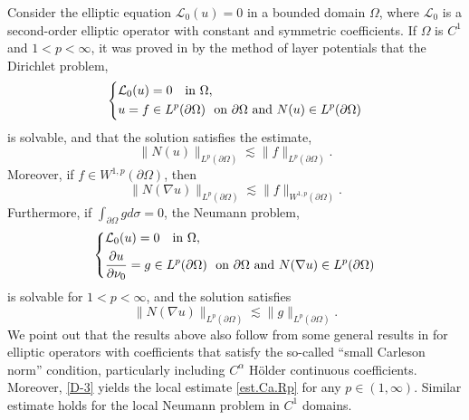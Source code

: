 \documentclass[reqno,12pt]{amsart} %
\theoremstyle{definition}
\theoremstyle{remark}
\numberwithin{equation}{section}
\begin{document}
Consider the elliptic equation 
$\mathcal{L}_0(u)=0$ in a bounded domain $\Omega$, where $\mathcal{L}_0$ is a second-order elliptic operator with constant and symmetric  coefficients.
If $\Omega$ is $C^1$ and $1<p< \infty$, it was proved  in \cite{Fabes1978} by the method of layer potentials that the Dirichlet problem,
\begin{equation}\label{D-1}
\left\{
\aligned 
& \mathcal{L}_0 (u) =0 \ \ \text{ in } \Omega,\\
& u=f \in L^p(\partial\Omega) \   \text{ on } \partial\Omega \text{ and } N(u) \in L^p(\partial\Omega)
\endaligned
\right.
\end{equation}
is solvable, and that  the solution satisfies the estimate, 
\begin{equation}\label{D-2}
\| N(u) \|_{L^p(\partial\Omega)}
\lesssim \| f \|_{L^p(\partial\Omega)}.
\end{equation}
Moreover, if $f\in W^{1, p}(\partial\Omega)$, then 
\begin{equation}\label{D-3}
\| N(\nabla u)\|_{L^p(\partial\Omega)}
\lesssim \| f\|_{W^{1, p}(\partial\Omega)}.
\end{equation}
Furthermore, if $\int_{\partial \Omega} g d\sigma =0$, the Neumann problem,
\begin{equation}\label{D-4}
\left\{
\aligned 
& \mathcal{L}_0 (u) =0 \ \ \text{ in } \Omega,\\
& \frac{\partial u}{\partial \nu_0}=g \in L^p(\partial\Omega) \   \text{ on } \partial\Omega \text{ and } N(\nabla u) \in L^p(\partial\Omega)
\endaligned
\right.
\end{equation}
is solvable for $1< p< \infty$, and  
the solution satisfies 
\begin{equation}\label{D-5}
    \| N(\nabla u) \|_{L^p(\partial\Omega)}
\lesssim \| g \|_{L^p(\partial\Omega)}.
\end{equation}
We point out that the results above also follow from some general results in 
\cite{DPP07, Dindos2017} for elliptic operators with coefficients that satisfy the so-called ``small Carleson norm'' condition, particularly including $C^\alpha$ H\"{o}lder continuous coefficients. Moreover, \eqref{D-3} yields the local estimate \eqref{est.Ca.Rp} for any $p\in (1,\infty)$. Similar estimate holds for the local Neumann problem in $C^1$ domains.
\end{document}

